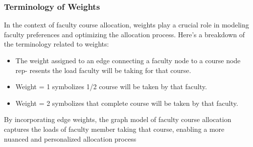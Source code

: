 \documentclass{article}
\begin{document}
\subsubsection{Terminology of Weights}

In the context of faculty course allocation, weights play a crucial role in modeling faculty preferences and optimizing the allocation process. Here's a breakdown of the terminology related to weights:

\begin{itemize}
\item The weight assigned to an edge connecting a faculty node to a course node rep-
resents the load faculty will be taking for that course.
\item Weight = 1 symbolizes 1/2 course will be taken by that faculty. 
\item Weight = 2 symbolizes that complete course will be taken by that faculty.
\end{itemize}

By incorporating edge weights, the graph model of faculty course allocation captures the loads of faculty member taking that course, enabling a more nuanced and personalized allocation process
\end{document}
